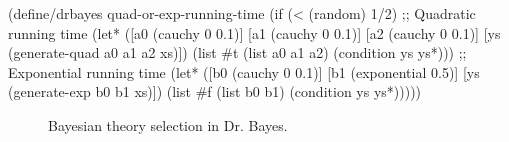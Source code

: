 \begin{lrbox}{\codebox}
\begin{varwidth}[b]{\textwidth}
\def\oldcodesize{\codesize}
\def\codesize{\small}
\begin{center}\singlespacing
\begin{schemedisplay}
(define/drbayes quad-or-exp-running-time
  (if (< (random) 1/2)
      ;; Quadratic running time
      (let* ([a0  (cauchy 0 0.1)]
             [a1  (cauchy 0 0.1)]
             [a2  (cauchy 0 0.1)]
             [ys  (generate-quad a0 a1 a2 xs)])
        (list #t (list a0 a1 a2)
              (condition ys ys*)))
      ;; Exponential running time
      (let* ([b0  (cauchy 0 0.1)]
             [b1  (exponential 0.5)]
             [ys  (generate-exp b0 b1 xs)])
        (list #f (list b0 b1)
              (condition ys ys*)))))
\end{schemedisplay}
\end{center}
\def\codesize{\oldcodesize}
\end{varwidth}
\end{lrbox}


\begin{figure}[tb!]\centering
{}
\tab
{}
\caption[Bayesian theory selection in Dr. Bayes]{Bayesian theory selection in Dr. Bayes.}
\label{fig:model-selection}
\end{figure}

